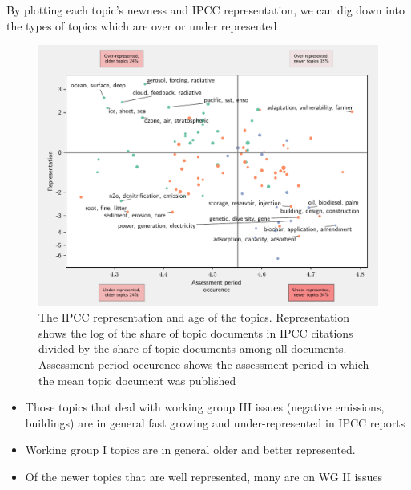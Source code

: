 \documentclass{article}
\begin{document}

\bigskip

\noindent By plotting each topic's newness and IPCC representation, we can dig down into the types of topics which are over or under represented

\begin{figure}[h!]
	\begin{center}
		\includegraphics[width=0.85\linewidth]{plots/ipcc_representation/ipcc_rep_new1771_all.pdf}
		\caption{The IPCC representation and age of the topics. Representation shows the log of the share of topic documents in IPCC citations divided by the share of topic documents among all documents. Assessment period occurence shows the assessment period in which the mean topic document was published}
		\label{ipcc_rep}
	\end{center}
\end{figure}

\begin{itemize}
	\item Those topics that deal with working group III issues (negative emissions, buildings) are in general fast growing and under-represented in IPCC reports
	\item Working group I topics are in general older and better represented. 
	\item Of the newer topics that are well represented, many are on WG II issues 
\end{itemize}
\end{document}
